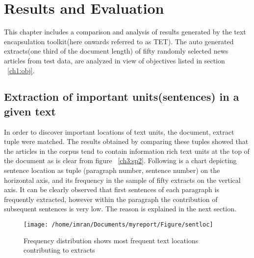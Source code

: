 \chapter{Results and Evaluation} This chapter includes a comparison and analysis of results generated by the text encapsulation toolkit(here onwards referred to as 
TET). The auto generated extracts(one third of the document length) of fifty randomly selected news articles from test data, are analyzed in view of objectives listed in section ~\ref{ch1:obj}.
\section{Extraction of important units(sentences) in a given text}
In order to discover important locations of text units, the document, extract tuple were matched. The results obtained by comparing these tuples showed that the 
articles in the corpus tend to contain information rich text units at the top of the document as is clear from figure ~\ref{ch3:sp2}. 
Following is a chart depicting sentence location as tuple (paragraph number, sentence number) on the horizontal axis, and its frequency in the sample of fifty extracts
on the vertical axis. It can be clearly observed that first sentences of each paragraph is frequently extracted, however within the paragraph the contribution of subsequent
sentences is very low. The reason is explained in the next section.
\begin{figure}[h]
 \texttt{[image: /home/imran/Documents/myreport/Figure/sentloc]}
 \caption{\singlespace Frequency distribution shows most frequent text locations contributing to extracts}
 \label{ch5:sentloc}
\end{figure}
